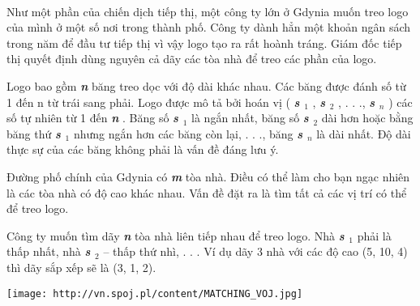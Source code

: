  

Như một phần của chiến dịch tiếp thị, một công ty lớn ở Gdynia muốn treo logo của mình ở một số nơi trong thành phố. Công ty dành hẳn một khoản ngân sách trong năm để đầu tư tiếp thị vì vậy logo tạo ra rất hoành tráng. Giám đốc tiếp thị quyết định dùng nguyên cả dãy các tòa nhà để treo các phần của logo.

Logo bao gồm \textbf{\emph{ n }} băng treo dọc với độ dài khác nhau. Các băng được đánh số từ 1 đến n từ trái sang phải. Logo được mô tả bởi hoán vị ( \textbf{\emph{ s $_ 1 $}} , \textbf{\emph{ s $_ 2 $}} , . . ., \textbf{\emph{ s $_ n $}} ) các số tự nhiên từ 1 đến \textbf{\emph{ n }} . Băng số \textbf{\emph{ s $_ 1 $}} là ngắn nhất, băng số \textbf{\emph{ s $_ 2 $}} dài hơn hoặc bằng băng thứ \textbf{\emph{ s $_ 1 $}} nhưng ngắn hơn các băng còn lại, . . ., băng \textbf{\emph{ s $_ n $}} là dài nhất. Độ dài thực sự của các băng không phải là vấn đề đáng lưu ý.

Đường phố chính của Gdynia có \textbf{\emph{ m }} tòa nhà. Điều có thể làm cho bạn ngạc nhiên là các tòa nhà có độ cao khác nhau. Vấn đề đặt ra là tìm tất cả các vị trí có thể để treo logo.

Công ty muốn tìm dãy \textbf{\emph{ n }} tòa nhà liên tiếp nhau để treo logo. Nhà \textbf{\emph{ s $_ 1 $}} phải là thấp nhất, nhà \textbf{\emph{ s $_ 2 $}} – thấp thứ nhì, . . . Ví dụ dãy 3 nhà với các độ cao (5, 10, 4) thì dãy sắp xếp sẽ là (3, 1, 2).


\texttt{[image: http://vn.spoj.pl/content/MATCHING\_VOJ.jpg]}

\
